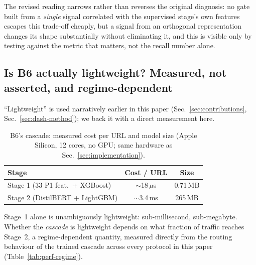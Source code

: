 \documentclass[conference]{IEEEtran}
\begin{document}
The revised reading narrows rather than reverses the original diagnosis:
no gate built from a \emph{single} signal correlated with the supervised
stage's own features escapes this trade-off cheaply, but a signal from an
orthogonal representation changes its shape substantially without eliminating it, and this is
visible only by testing against the metric that matters, not the recall
number alone.

\subsection{Is B6 actually lightweight? Measured, not asserted, and
regime-dependent}
\label{sec:lightweight}

``Lightweight'' is used narratively earlier in this paper
(Sec.~\ref{sec:contributions}, Sec.~\ref{sec:dash-method}); we back it
with a direct measurement here.

\begin{table}[t]
\caption{B6's cascade: measured cost per URL and model size (Apple Silicon, 12 cores, no GPU; same hardware as
Sec.~\ref{sec:implementation}).}
\label{tab:perf}
\centering\scriptsize
\setlength{\tabcolsep}{3pt}
\begin{tabular}{@{}lcc@{}}
\toprule
\textbf{Stage} & \textbf{Cost / URL} & \textbf{Size}\\
\midrule
Stage 1 (33 P1 feat.\ + XGBoost) & $\sim$18\,$\mu$s & 0.71\,MB\\
Stage 2 (DistilBERT + LightGBM) & $\sim$3.4\,ms & 265\,MB\\
\bottomrule
\end{tabular}
\end{table}

Stage~1 alone is unambiguously lightweight: sub-millisecond, sub-megabyte.
Whether the \emph{cascade} is lightweight depends on what fraction of traffic reaches Stage~2, a regime-dependent
quantity, measured directly
from the routing behaviour of the trained cascade across every protocol
in this paper (Table~\ref{tab:perf-regime}).
\end{document}

